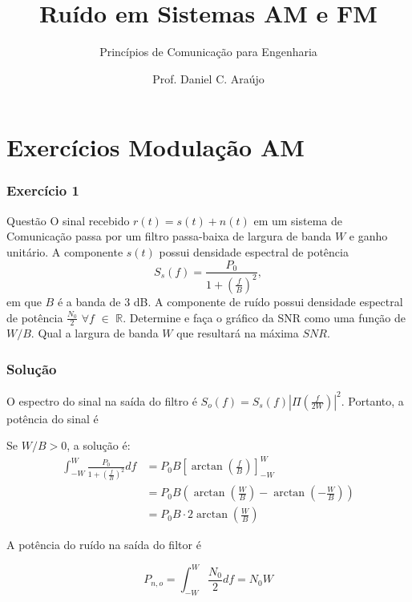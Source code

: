 \documentclass{beamer}
\title{Ruído em Sistemas AM e FM}
\subtitle{Princípios de Comunicação para Engenharia }
\author{Prof. Daniel C. Araújo}
\institute{Universidade de Brasília}
\begin{document}
\frame{\titlepage}


\section{Exercícios Modulação AM}


\begin{frame}
  \frametitle{Exercício 1}

  \begin{block}{Questão}
    O sinal recebido $r(t) = s(t) + n(t)$ em um sistema de Comunicação
    passa por um filtro passa-baixa de largura de banda $W$ e ganho unitário.
    A componente $s(t)$ possui densidade espectral de potência
    $$
    S_s(f) = \frac{P_0}{1+\left(\frac{f}{B}\right)^2},
    $$
    em que $B$ é a banda de 3 dB. A componente de ruído possui densidade
    espectral de potência $\frac{N_0}{2}$ $\forall f$ $\in$ $\mathbb{R}$. Determine e
    faça o gráfico da SNR como uma função de $W/B$. Qual a largura de banda $W$ que 
    resultará na máxima $SNR$.
  \end{block}

\end{frame}

\begin{frame}
  \frametitle{Solução}

    O espectro do sinal na saída do filtro é
    $S_o(f) = S_s(f) |\Pi \left(\frac{f}{2W}\right)|^2$. Portanto, 
    a potência do sinal é 
    
    Se $W/B > 0$, a solução é:
    \begin{align*}
    \int_{-W}^{W} \frac{P_0}{1 + \left(\frac{f}{B}\right)^2} df &= P_0 B \left[\arctan\left(\frac{f}{B}\right)\right]_{-W}^{W} \\
    &= P_0 B \left(\arctan\left(\frac{W}{B}\right) - \arctan\left(-\frac{W}{B}\right)\right) \\
    &= P_0 B \cdot 2 \arctan\left(\frac{W}{B}\right)
    \end{align*}

    A potência do ruído na saída do filtor é

    $$
    P_{n,o} = \int _{-W}^{W} \frac{N_0}{2}df = N_0 W
     $$

\end{frame}
\end{document}
